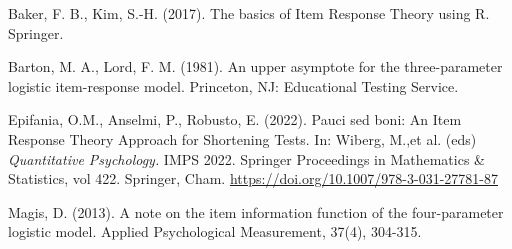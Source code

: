 \documentclass{svproc}
\begin{document}
%
\begin{thebibliography}{6}
%

 Baker, F. B., Kim, S.-H. (2017). The basics of Item Response Theory using R. Springer.

Barton, M. A., Lord, F. M. (1981). An upper asymptote for the three-parameter logistic item-response
model. Princeton, NJ: Educational Testing Service.



Epifania, O.M., Anselmi, P., Robusto, E. (2022). Pauci sed boni: An Item Response Theory Approach for Shortening Tests. In: Wiberg, M.,et al. (eds) \textit{Quantitative Psychology.} IMPS 2022. Springer Proceedings in Mathematics \& Statistics, vol 422. Springer, Cham. \url{https://doi.org/10.1007/978-3-031-27781-87}



Magis, D. (2013). A note on the item information function of the four-parameter logistic model. Applied Psychological Measurement, 37(4), 304-315.






\end{thebibliography}
\end{document}
